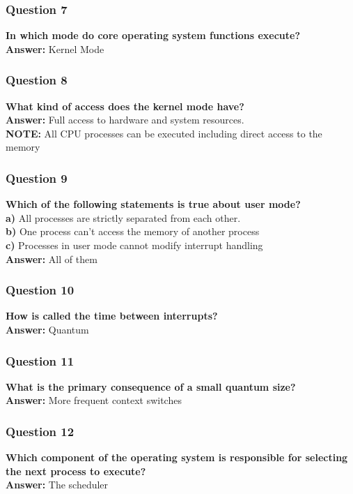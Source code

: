 \documentclass{article}
\begin{document}
\subsubsection*{Question 7}
\textbf{In which mode do core operating system functions execute?} \\
\textbf{Answer:} Kernel Mode

\subsubsection*{Question 8}
\textbf{What kind of access does the kernel mode have?} \\
\textbf{Answer:} Full access to hardware and system resources.  \\
\textbf{NOTE:} All CPU processes can be executed including direct access to the memory

\subsubsection*{Question 9}
\textbf{Which of the following statements is true about user mode?} \\
\textbf{a)} All processes are strictly separated from each other. \\
\textbf{b)} One process can't access the memory of another process \\
\textbf{c)} Processes in user mode cannot modify interrupt handling \\
\textbf{Answer:} All of them

\subsubsection*{Question 10}
\textbf{How is called the time between interrupts?} \\
\textbf{Answer:} Quantum

\subsubsection*{Question 11}
\textbf{What is the primary consequence of a small quantum size?} \\
\textbf{Answer:} More frequent context switches

\subsubsection*{Question 12}
\textbf{Which component of the operating system is responsible for selecting the next process to execute?} \\
\textbf{Answer:} The scheduler
\end{document}
